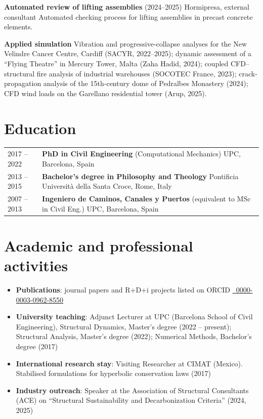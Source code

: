\documentclass[12pt]{article}
\begin{document}
\parbox{\linewidth}{
    \textbf{Automated review of lifting assemblies} (2024--2025) Hormipresa, external consultant \newline
    Automated checking process for lifting assemblies in precast concrete elements.}

\parbox{\linewidth}{
    \textbf{Applied simulation} \newline
    Vibration and progressive-collapse analyses for the New Velindre Cancer Centre, Cardiff (SACYR, 2022--2025);
    dynamic assessment of a ``Flying Theatre'' in Mercury Tower, Malta (Zaha Hadid, 2024);
    coupled CFD--structural fire analysis of industrial warehouses (SOCOTEC France, 2023);
    crack-propagation analysis of the 15th-century dome of Pedralbes Monastery (2024);
    CFD wind loads on the Garellano residential tower (Arup, 2025).}


\section{Education}
\begin{tabularx}{\linewidth}{lX}
    2017 -- 2022 &
    \textbf{PhD in Civil Engineering} (Computational Mechanics) \newline
    UPC, Barcelona, Spain \\

    2013 -- 2015 &
    \textbf{Bachelor's degree in Philosophy and Theology} \newline
    Pontificia Università della Santa Croce, Rome, Italy \\

    2007 -- 2013 &
    \textbf{Ingeniero de Caminos, Canales y Puertos} (equivalent to MSc in Civil Eng.) \newline
    UPC, Barcelona, Spain \\
\end{tabularx}


\section{Academic and professional activities}
\begin{itemize}
    \item \textbf{Publications}: journal papers and R+D+i projects listed on ORCID \href{https://orcid.org/0000-0003-0962-8550}{\faOrcid \ 0000-0003-0962-8550}
    \item \textbf{University teaching}: Adjunct Lecturer at UPC (Barcelona School of Civil Engineering), Structural Dynamics, Master's degree (2022 -- present); Structural Analysis, Master's degree (2022); Numerical Methods, Bachelor's degree (2017)
    \item \textbf{International research stay}: Visiting Researcher at CIMAT (Mexico). Stabilised formulations for hyperbolic conservation laws (2017)
    \item \textbf{Industry outreach}: Speaker at the Association of Structural Consultants (ACE) on ``Structural Sustainability and Decarbonization Criteria'' (2024, 2025)
\end{itemize}
\end{document}
